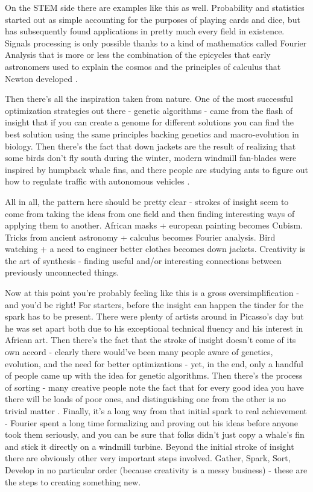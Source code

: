 \documentclass[11pt]{book}
\begin{document}
On the STEM side there are examples like this as well. Probability and statistics started out as simple accounting for the purposes of playing cards and dice, but has subsequently found applications in pretty much every field in existence. Signals processing is only possible thanks to a kind of mathematics called Fourier Analysis that is more or less the combination of the epicycles that early astronomers used to explain the cosmos and the principles of calculus that Newton developed \cite{gnu}. 
\newline

Then there's all the inspiration taken from nature. One of the most successful optimization strategies out there - genetic algorithms - came from the flash of insight that if you can create a genome for different solutions you can find the best solution using the same principles backing genetics and macro-evolution in biology. Then there's the fact that down jackets are the result of realizing that some birds don't fly south during the winter, modern windmill fan-blades were inspired by humpback whale fins, and there people are studying ants to figure out how to regulate traffic with autonomous vehicles \cite{biomimicry}.
\newline

All in all, the pattern here should be pretty clear - strokes of insight seem to come from taking the ideas from one field and then finding interesting ways of applying them to another. African masks + european painting becomes Cubism. Tricks from ancient astronomy + calculus becomes Fourier analysis. Bird watching + a need to engineer better clothes becomes down jackets. Creativity is the art of synthesis - finding useful and/or interesting connections between previously unconnected things.
\newline 

Now at this point you're probably feeling like this is a gross oversimplification - and you'd be right! For starters, before the insight can happen the tinder for the spark has to be present. There were plenty of artists around in Picasso's day but he was set apart both due to his exceptional technical fluency and his interest in African art. Then there's the fact that the stroke of insight doesn't come of its own accord - clearly there would've been many people aware of genetics, evolution, and the need for better optimizations - yet, in the end, only a handful of people came up with the idea for genetic algorithms. Then there's the process of sorting - many creative people note the fact that for every good idea you have there will be loads of poor ones, and distinguishing one from the other is no trivial matter \cite{kaufman}. Finally, it's a long way from that initial spark to real achievement - Fourier spent a long time formalizing and proving out his ideas before anyone took them seriously, and you can be sure that folks didn't just copy a whale's fin and stick it directly on a windmill turbine. Beyond the initial stroke of insight there are obviously other very important steps involved. Gather, Spark, Sort, Develop in no particular order (because creativity is a messy business) - these are the steps to creating something new. 
\newline
\end{document}
